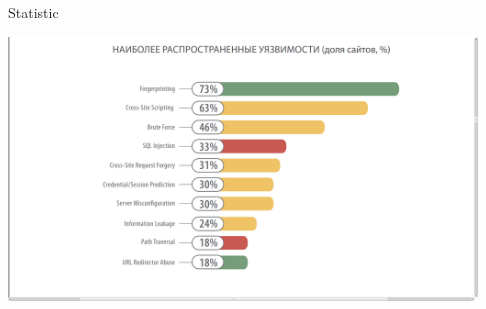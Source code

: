 \begin{frame}[fragile]{Statistic}
  \begin{center}
    \includegraphics[height=7cm, keepaspectratio]{sources/images/securtiy_statistic.png}
  \end{center}
\end{frame}